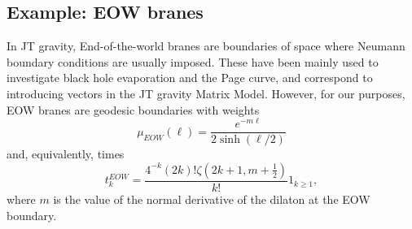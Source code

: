 \documentclass[a4paper,11pt]{article}
\newcommand{\rmd}{\mathrm{d}}
\begin{document}
\subsection{Example: EOW branes}
In JT gravity, End-of-the-world branes are boundaries of space where Neumann boundary conditions are usually imposed. These have been mainly used to investigate black hole evaporation and the Page curve\cite{Penington:2019kki}, and correspond to introducing vectors in the JT gravity Matrix Model. However, for our purposes, EOW branes are geodesic boundaries with weights \cite{Gao:2021uro}
\begin{equation}
    \mu_
{EOW}(\ell)=\frac{e^{-m\ell}}{2\sinh{\left(\ell/2\right)}}\label{eq:eow_weight}
\end{equation}
and, equivalently, times 
\begin{equation}
    t^{EOW}_k=\frac{4^{-k}(2k)! \zeta \left(2 k+1,m+\frac{1}{2}\right)}{k!} \mathrm{1}_{k\geq 1},
\end{equation}
where $m$ is the value of the normal derivative of the dilaton at the EOW boundary.

\end{document}
